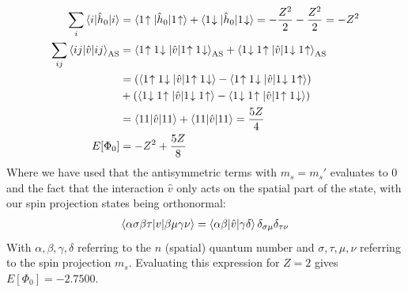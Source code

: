 \documentclass{article}
\newcommand{\upst}[1]{#1\hspace{-2px}\uparrow}
\newcommand{\downst}[1]{#1\hspace{-2px}\downarrow}
\newcommand{\inner}[3]{\braket{#1|#2|#3}}
\newcommand{\innerAS}[3]{\inner{#1}{#2}{#3}_{\text{AS}}}
\newcommand{\hnull}{\hat{h}_0}
\begin{document}
    \begin{align*}
        \sum_{i} \inner{i}{\hnull}{i} &= \inner{\upst{1}}{\hnull}{\upst{1}} + \inner{\downst{1}}{\hnull}{\downst{1}} = -\frac{Z^2}{2} -\frac{Z^2}{2} = -Z^2 \\
        \sum_{ij} \innerAS{ij}{\hat{v}}{ij}  &=\innerAS{\upst{1}\downst{1}}{\hat{v}}{\upst{1}\downst{1}} + \innerAS{\downst{1}\upst{1}}{\hat{v}}{\downst{1}\upst{1}} \\
        &=  (\inner{\upst{1}\downst{1}}{\hat{v}}{\upst{1}\downst{1}} - \inner{\upst{1}\downst{1}}{\hat{v}}{\downst{1}\upst{1}}) \\
        &+(\inner{\downst{1}\upst{1}}{\hat{v}}{\downst{1}\upst{1}} - \inner{\downst{1}\upst{1}}{\hat{v}}{\upst{1}\downst{1}}) \\
        &= \inner{11}{\hat{v}}{11} + \inner{11}{\hat{v}}{11} = \frac{5Z}{4} \\
        E[\Phi_0] &= -Z^2 + \frac{5Z}{8}
    \end{align*}
    Where we have used that the antisymmetric terms with $m_s = m_s'$ evaluates to 0 and the fact that the interaction $\hat{v}$ only acts on the spatial part of the state, with our spin projection states being orthonormal:
    \begin{align*}
        \inner{\alpha\sigma\beta\tau}{v}{\beta\mu\gamma\nu} = \inner{\alpha \beta}{\hat{v}}{\gamma \delta} \delta_{\sigma\mu}\delta_{\tau\nu}
    \end{align*}
    With $\alpha, \beta, \gamma, \delta$ referring to the $n$ (spatial) quantum number and $\sigma, \tau, \mu, \nu$ referring to the spin projection $m_s$. Evaluating this expression for $Z=2$ gives $E[\Phi_0] = -2.7500$. 
    
\end{document}
